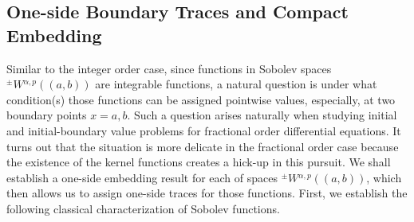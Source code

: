 \documentclass[leqno,final]{siamltex}
\numberwithin{equation}{section}
\renewcommand{\(}{\bigl(}
\renewcommand{\)}{\bigr)}
\newcommand{\R}{\mathbb{R}}
\begin{document}
   
    
    \subsection{One-side Boundary Traces and Compact Embedding}\label{sec-4.3}
    Similar to the integer order case, since functions in Sobolev spaces ${^{\pm}}{W}{^{\alpha,p}}((a,b))$
    are integrable functions, a natural question is under what condition(s) those functions can be 
    assigned pointwise values, especially, at two boundary points $x=a,b$. Such a question arises naturally when 
    studying initial and initial-boundary value problems for fractional order differential equations. 
    It turns out that the situation is more delicate in the fractional order case because the existence of the kernel functions creates a hick-up in this pursuit. We shall establish a one-side embedding result for each of spaces 
    ${^{\pm}}{W}{^{\alpha,p}}((a,b))$, which then allows us to assign one-side traces for those functions.  
    First, we establish the following classical characterization of Sobolev functions.
    
\end{document}
